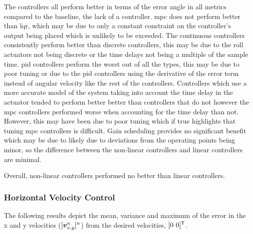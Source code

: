The controllers all perform better in terms of the error angle in all metrics compared to the baseline, the lack of a controller. 
\gls{mpc} does not perform better than \gls{lqr}, which may be due to only a constant constraint on the controller's output being placed which is unlikely to be exceeded.
The continuous controllers consistently perform better than discrete controllers, this may be due to the roll actuators not being discrete or the time delays not being a multiple of the sample time.
\Gls{pid} controllers perform the worst out of all the types, this may be due to poor tuning or due to the \gls{pid} controllers using the derivative of the error term instead of angular velocity like the rest of the controllers.
Controllers which use a more accurate model of the system taking into account the time delay in the actuator tended to perform better better than controllers that do not however the \gls{mpc} controllers performed worse when accounting for the time delay than not.
However, this may have been due to poor tuning which if true highlights that tuning \gls{mpc} controllers is difficult.
Gain scheduling provides no significant benefit which may be due to likely due to deviations from the operating points being minor, so the difference between the non-linear controllers and linear controllers are minimal.

Overall, non-linear controllers performed no better than linear controllers. 

\subsubsection{Horizontal Velocity Control}
The following results depict the mean, variance and maximum of the error in the x and y velocities ($[\bm v^n_{x,y}]^n$) from the desired velocities, $[0 \ 0]^\mathsf{T}$.

